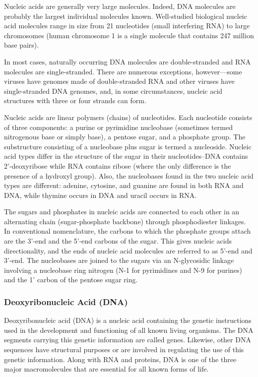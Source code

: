 Nucleic acids are generally very large molecules. Indeed, DNA molecules
are probably the largest individual molecules known. Well-studied
biological nucleic acid molecules range in size from 21 nucleotides
(small interfering RNA) to large chromosomes (human chromosome 1 is a
single molecule that contains 247 million base pairs).

In most cases, naturally occurring DNA molecules are double-stranded and
RNA molecules are single-stranded. There are numerous exceptions,
however---some viruses have genomes made of double-stranded RNA and
other viruses have single-stranded DNA genomes, and, in some
circumstances, nucleic acid structures with three or four strands can
form.

Nucleic acids are linear polymers (chains) of nucleotides. Each
nucleotide consists of three components: a purine or pyrimidine
nucleobase (sometimes termed nitrogenous base or simply base), a pentose
sugar, and a phosphate group. The substructure consisting of a
nucleobase plus sugar is termed a nucleoside. Nucleic acid types differ
in the structure of the sugar in their nucleotides--DNA contains
2'-deoxyribose while RNA contains ribose (where the only difference is
the presence of a hydroxyl group). Also, the nucleobases found in the
two nucleic acid types are different: adenine, cytosine, and guanine are
found in both RNA and DNA, while thymine occurs in DNA and uracil occurs
in RNA.

The sugars and phosphates in nucleic acids are connected to each other
in an alternating chain (sugar-phosphate backbone) through
phosphodiester linkages. In conventional nomenclature, the carbons to
which the phosphate groups attach are the 3'-end and the 5'-end carbons
of the sugar. This gives nucleic acids directionality, and the ends of
nucleic acid molecules are referred to as 5'-end and 3'-end. The
nucleobases are joined to the sugars via an N-glycosidic linkage
involving a nucleobase ring nitrogen (N-1 for pyrimidines and N-9 for
purines) and the 1' carbon of the pentose sugar ring.

\hypertarget{deoxyribonucleic-acid-dna}{%
\subsubsection{Deoxyribonucleic Acid
(DNA)}\label{deoxyribonucleic-acid-dna}}

Deoxyribonucleic acid (DNA) is a nucleic acid containing the genetic
instructions used in the development and functioning of all known living
organisms. The DNA segments carrying this genetic information are called
genes. Likewise, other DNA sequences have structural purposes or are
involved in regulating the use of this genetic information. Along with
RNA and proteins, DNA is one of the three major macromolecules that are
essential for all known forms of life.

